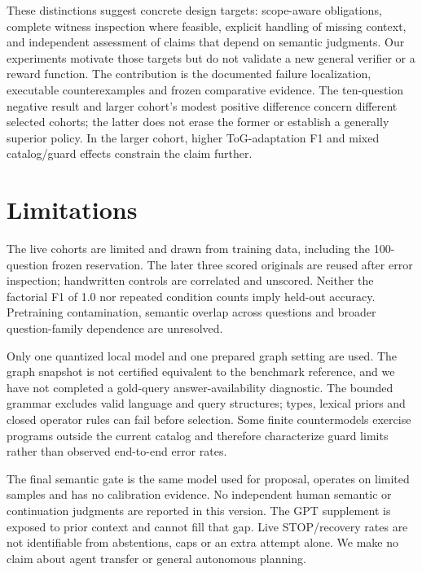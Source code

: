 \documentclass[10pt]{article}
\begin{document}
These distinctions suggest concrete design targets: scope-aware obligations, complete witness inspection where feasible, explicit handling of missing context, and independent assessment of claims that depend on semantic judgments. Our experiments motivate those targets but do not validate a new general verifier or a reward function. The contribution is the documented failure localization, executable counterexamples and frozen comparative evidence. The ten-question negative result and larger cohort's modest positive difference concern different selected cohorts; the latter does not erase the former or establish a generally superior policy. In the larger cohort, higher ToG-adaptation F1 and mixed catalog/guard effects constrain the claim further.\par

\section{Limitations}

The live cohorts are limited and drawn from training data, including the 100-question frozen reservation. The later three scored originals are reused after error inspection; handwritten controls are correlated and unscored. Neither the factorial F1 of 1.0 nor repeated condition counts imply held-out accuracy. Pretraining contamination, semantic overlap across questions and broader question-family dependence are unresolved.\par

Only one quantized local model and one prepared graph setting are used. The graph snapshot is not certified equivalent to the benchmark reference, and we have not completed a gold-query answer-availability diagnostic. The bounded grammar excludes valid language and query structures; types, lexical priors and closed operator rules can fail before selection. Some finite countermodels exercise programs outside the current catalog and therefore characterize guard limits rather than observed end-to-end error rates.\par

The final semantic gate is the same model used for proposal, operates on limited samples and has no calibration evidence. No independent human semantic or continuation judgments are reported in this version. The GPT supplement is exposed to prior context and cannot fill that gap. Live STOP/recovery rates are not identifiable from abstentions, caps or an extra attempt alone. We make no claim about agent transfer or general autonomous planning.\par
\end{document}
